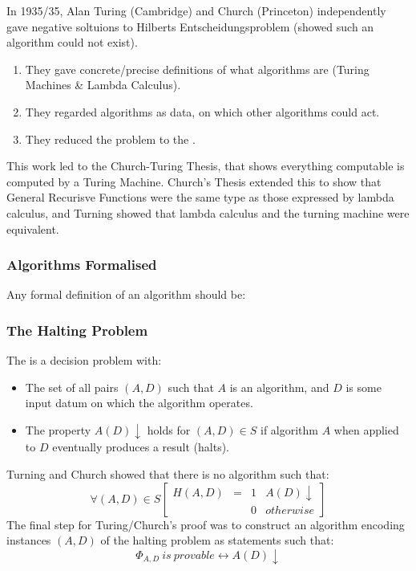 \documentclass{report}
\begin{document}
            In 1935/35, Alan Turing (Cambridge) and Church (Princeton) independently gave negative soltuions to Hilberts Entscheidungsproblem (showed such an algorithm could not exist).
            \begin{enumerate}
                \item They gave concrete/precise definitions of what algorithms are (Turing Machines \& Lambda Calculus).
                \item They regarded algorithms as data, on which other algorithms could act.
                \item They reduced the problem to the .
            \end{enumerate}
            This work led to the Church-Turing Thesis, that shows everything computable is computed by a Turing Machine. Church's Thesis extended this to show that General Recurisve Functions were the same type as those expressed by lambda calculus, and Turning showed that lambda calculus and the turning machine were equivalent.
        \subsubsection*{Algorithms Formalised}
            Any formal definition of an algorithm should be:
            \begin{itemize}
            \end{itemize}
        \subsubsection*{The Halting Problem}
            The  is a decision problem with:
            \begin{itemize}
                \item The set of all pairs $(A,D)$ such that $A$ is an algorithm, and $D$ is some input datum on which the algorithm operates.
                \item The property $A(D)\downarrow$ holds for $(A,D) \in S$ if algorithm $A$ when applied to $D$ eventually produces a result (halts).
            \end{itemize}
            Turning and Church showed that there is no algorithm such that:
            \[\forall (A,D) \in S \begin{bmatrix}
                H (A,D) & = & 1 & A(D)\downarrow \\
                & & 0 & otherwise
            \end{bmatrix}\]
            The final step for Turing/Church's proof was to construct an algorithm encoding instances $(A,D)$ of the halting problem as statements such that:
            \[\Phi_{A,D} \ is \ provable \leftrightarrow A(D)\downarrow\]
        
\end{document}
